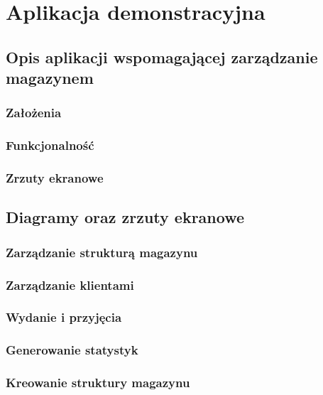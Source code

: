 \chapter{Aplikacja demonstracyjna}
\label{c6:c6}

\section{Opis aplikacji wspomagającej zarządzanie magazynem}
	\subsection{Założenia}
	\subsection{Funkcjonalność}
	\subsection{Zrzuty ekranowe}

\section{Diagramy oraz zrzuty ekranowe}
	\subsection{Zarządzanie strukturą magazynu}
	\subsection{Zarządzanie klientami}
	\subsection{Wydanie i przyjęcia}
	\subsection{Generowanie statystyk}
	\subsection{Kreowanie struktury magazynu}